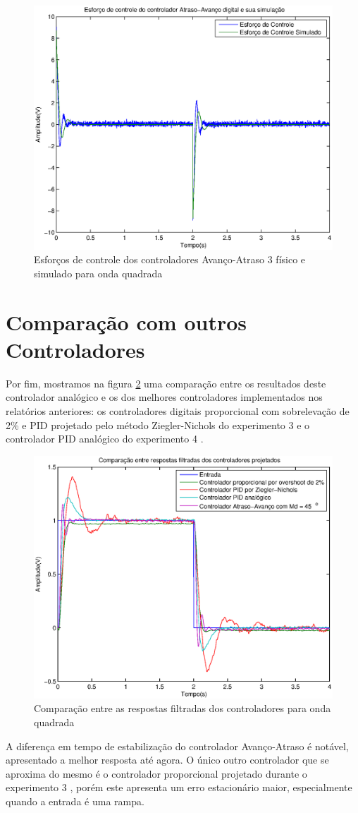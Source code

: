 \documentclass{article}
\begin{document}
\begin{figure}[H]
	\centering
	\includegraphics[width=0.8\linewidth]{ursim55}
	\caption{Esforços de controle dos controladores Avanço-Atraso 3 físico e simulado para onda quadrada}
	\label{fig:ursim55}
\end{figure}

\section{Comparação com outros Controladores}
Por fim, mostramos na figura \ref{fig:yrcomp} uma comparação entre os resultados deste controlador analógico e os dos melhores controladores implementados nos relatórios anteriores: os controladores digitais proporcional com sobrelevação de 2\% e PID projetado pelo método Ziegler-Nichols do experimento 3 \cite{bb:lab3} e o controlador PID analógico do experimento 4 \cite{bb:lab4}.
\begin{figure}[H]
	\centering
	\includegraphics[width=0.8\linewidth]{yfrcomp}
	\caption{Comparação entre as respostas filtradas dos controladores para onda quadrada}
	\label{fig:yrcomp}
\end{figure}
A diferença em tempo de estabilização do controlador Avanço-Atraso é notável, apresentado a melhor resposta até agora. O único outro controlador que se aproxima do mesmo é o controlador proporcional projetado durante o experimento 3 \cite{bb:lab3}, porém este apresenta um erro estacionário maior, especialmente quando a entrada é uma rampa.
\end{document}
